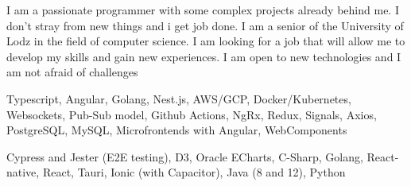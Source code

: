 \documentclass[9pt]{developercv}%
\begin{document}
\begin{minipage}[t]{0.45\textwidth} %
	\vspace{-\baselineskip}

	I am a passionate programmer with some complex projects already behind me. I don't stray from new things and i get job done. I am a senior of the University of Lodz in the field of computer science. I am looking for a job that will allow me to develop my skills and gain new experiences. I am open to new technologies and I am not afraid of challenges
\end{minipage}
\hfill
\begin{minipage}[t]{0.45\textwidth}
	\vspace{-\baselineskip}
	\begin{barchart}{3}
	\end{barchart}
\end{minipage}
\vspace{1.0cm}

\begin{minipage}[t]{0.45\textwidth}
	\vspace{-\baselineskip}

	Typescript, Angular, Golang, Nest.js, AWS/GCP, Docker/Kubernetes,
	Websockets, Pub-Sub model, Github Actions, NgRx, Redux, Signals, Axios,
	PostgreSQL, MySQL, Microfrontends with Angular, WebComponents
\end{minipage}
\hfill
\begin{minipage}[t]{0.45\textwidth}
	\vspace{-\baselineskip}

	Cypress and Jester (E2E testing), D3, Oracle ECharts, C-Sharp, Golang, React-native, React, Tauri, Ionic (with Capacitor), Java (8 and 12), Python
\end{minipage}
\vspace{1.0cm}

\end{document}
